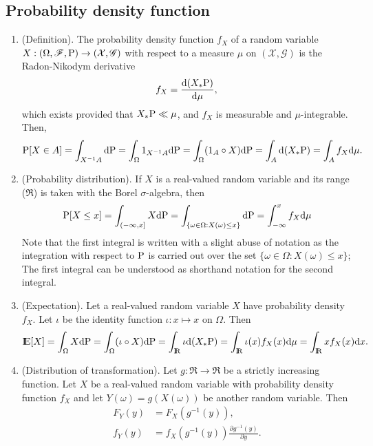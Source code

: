 \documentclass[a4paper,10pt]{scrbook}
\begin{document}
\subsection{Probability density function}
\begin{enumerate}
 \item (Definition).
    The probability density function $f_X$ of a random variable $X:(\Omega,\mathscr{F},\mathrm{P})\to (\mathcal{X},\mathscr{G})$
    with respect to a measure $\mu$ on $(\mathcal{X},\mathscr{G})$ is the Radon-Nikodym derivative
    \[
     f_X = \frac{\mathrm{d} (X_*\mathrm{P})}{\mathrm{d} \mu},
    \]
    which exists provided that $X_*\mathrm{P} \ll \mu$, and $f_X$ is measurable and $\mu$-integrable. Then,
    \begin{align*}
     \mathrm{P}[X\in A] = \int_{X^{-1}A}\mathrm{d} \mathrm{P}
                   = \int_{\Omega} 1_{X^{-1}A}\mathrm{d}\mathrm{P}
                   = \int_{\Omega} (1_{A}\circ X)\mathrm{d}\mathrm{P}
                   = \int_{A}\mathrm{d}(X_*\mathrm{P})
                   = \int_A f_X \mathrm{d} \mu.
    \end{align*}
  \item (Probability distribution).
	If $X$ is a real-valued random variable and its range ($\Re$) is taken with the 
        Borel $\sigma$-algebra, then 
        \begin{align*}
         \mathrm{P}[X\leq x] = \int_{(-\infty, x]}X\mathrm{d} \mathrm{P}
         = \int_{\{\omega\in\Omega: X(\omega) \leq x\}}\mathrm{d} \mathrm{P}
         = \int_{-\infty}^x f_X\mathrm{d} \mu
        \end{align*}
        Note that the first integral is written with a slight abuse of notation as the 
        integration with respect to $\mathrm{P}$ is carried out over the set $\{\omega\in\Omega: X(\omega) \leq x\}$;
        The first integral can be understood as shorthand notation for the second integral.
  \item (Expectation).
	Let a real-valued random variable $X$ have probability density $f_X$. Let $\iota$
	be the identity function $\iota:x\mapsto x$ on $\Omega$. Then
        \[
         \E[X] = \int_\Omega X\d\prob 
               = \int_\Omega (\iota\circ X)\d\prob 
               = \int_\Re \iota\d(X_*\prob)
               = \int_\Re \iota(x) f_X(x) \d\mu
               = \int_\Re x f_X(x) \d x.
        \]
  \item (Distribution of transformation). Let $g:\Re\to\Re$ be a strictly increasing function. 
         Let $X$ be a real-valued random variable with probability density function $f_X$ 
         and let $Y(\omega) = g(X(\omega))$ be another random variable. Then
  \begin{align*}
   F_Y(y) &= F_X(g^{-1}(y)),\\
   f_Y(y) &= f_X(g^{-1}(y))\frac{\partial g^{-1}(y)}{\partial y}.
  \end{align*}
  

\end{enumerate}
\end{document}
